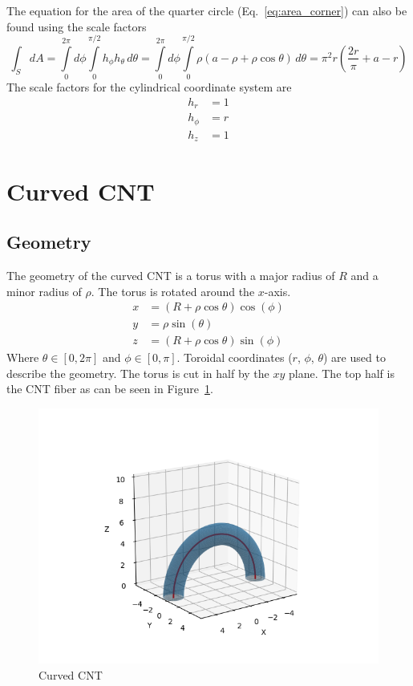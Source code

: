 \documentclass[a4paper,10pt]{article}
\numberwithin{equation}{section}
\begin{document}
%
The equation for the area of the quarter circle (Eq.~\ref{eq:area_corner}) can also be found using the scale factors
\begin{equation}
  \int_S dA = \int\limits_0^{2\pi} d\phi \int\limits_0^{\pi/2} h_\phi h_\theta\, d\theta = \int\limits_0^{2\pi} d\phi \int\limits_0^{\pi/2} \rho(a - \rho + \rho\cos\theta)\, d\theta = \pi^2 r \left( \frac{2r}{\pi} + a - r \right)
\end{equation}
%
The scale factors for the cylindrical coordinate system are
\begin{align}
  h_r    & = 1\\
  h_\phi & = r\\
  h_z    & = 1
\end{align}
%
%
\section{Curved CNT}
\subsection{Geometry}
The geometry of the curved CNT is a torus with a major radius of \(R\) and a minor radius of \(\rho\). The torus is rotated around the \(x\)-axis.
\begin{align}
x &= \left(R + \rho\cos\theta\right)\cos(\phi)\\
y &= \rho\sin(\theta)\\
z &= \left(R + \rho\cos\theta\right)\sin(\phi)
\end{align}
Where \(\theta \in [0, 2\pi]\) and \(\phi \in [0, \pi]\). Toroidal coordinates (\(r\), \(\phi\), \(\theta\)) are used to describe the geometry.
The torus is cut in half by the \(xy\) plane.
The top half is the CNT fiber as can be seen in Figure~\ref{fig:curved_cnt}.
\begin{figure}
  \centering
  \includegraphics[scale=0.4]{figures/curved_cnt.png}
  \caption{Curved CNT\label{fig:curved_cnt}}
\end{figure}
\end{document}
